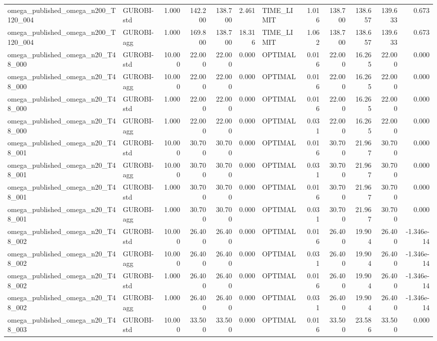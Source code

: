 \begin{table}[htbp]
\begin{tabular}{llrrrrlrrrrr}
omega\_published\_omega\_n200\_T120\_004 & GUROBI-std & 1.000 & 142.200 & 138.700 & 2.461 & TIME\_LIMIT & 1.016 & 138.700 & 138.657 & 139.633 & 0.673 \\
omega\_published\_omega\_n200\_T120\_004 & GUROBI-agg & 1.000 & 169.800 & 138.700 & 18.316 & TIME\_LIMIT & 1.062 & 138.700 & 138.657 & 139.633 & 0.673 \\
omega\_published\_omega\_n20\_T48\_000 & GUROBI-std & 10.000 & 22.000 & 22.000 & 0.000 & OPTIMAL & 0.016 & 22.000 & 16.265 & 22.000 & 0.000 \\
omega\_published\_omega\_n20\_T48\_000 & GUROBI-agg & 10.000 & 22.000 & 22.000 & 0.000 & OPTIMAL & 0.016 & 22.000 & 16.265 & 22.000 & 0.000 \\
omega\_published\_omega\_n20\_T48\_000 & GUROBI-std & 1.000 & 22.000 & 22.000 & 0.000 & OPTIMAL & 0.016 & 22.000 & 16.265 & 22.000 & 0.000 \\
omega\_published\_omega\_n20\_T48\_000 & GUROBI-agg & 1.000 & 22.000 & 22.000 & 0.000 & OPTIMAL & 0.031 & 22.000 & 16.265 & 22.000 & 0.000 \\
omega\_published\_omega\_n20\_T48\_001 & GUROBI-std & 10.000 & 30.700 & 30.700 & 0.000 & OPTIMAL & 0.016 & 30.700 & 21.967 & 30.700 & 0.000 \\
omega\_published\_omega\_n20\_T48\_001 & GUROBI-agg & 10.000 & 30.700 & 30.700 & 0.000 & OPTIMAL & 0.031 & 30.700 & 21.967 & 30.700 & 0.000 \\
omega\_published\_omega\_n20\_T48\_001 & GUROBI-std & 1.000 & 30.700 & 30.700 & 0.000 & OPTIMAL & 0.016 & 30.700 & 21.967 & 30.700 & 0.000 \\
omega\_published\_omega\_n20\_T48\_001 & GUROBI-agg & 1.000 & 30.700 & 30.700 & 0.000 & OPTIMAL & 0.031 & 30.700 & 21.967 & 30.700 & 0.000 \\
omega\_published\_omega\_n20\_T48\_002 & GUROBI-std & 10.000 & 26.400 & 26.400 & 0.000 & OPTIMAL & 0.016 & 26.400 & 19.904 & 26.400 & -1.346e-14 \\
omega\_published\_omega\_n20\_T48\_002 & GUROBI-agg & 10.000 & 26.400 & 26.400 & 0.000 & OPTIMAL & 0.031 & 26.400 & 19.904 & 26.400 & -1.346e-14 \\
omega\_published\_omega\_n20\_T48\_002 & GUROBI-std & 1.000 & 26.400 & 26.400 & 0.000 & OPTIMAL & 0.016 & 26.400 & 19.904 & 26.400 & -1.346e-14 \\
omega\_published\_omega\_n20\_T48\_002 & GUROBI-agg & 1.000 & 26.400 & 26.400 & 0.000 & OPTIMAL & 0.031 & 26.400 & 19.904 & 26.400 & -1.346e-14 \\
omega\_published\_omega\_n20\_T48\_003 & GUROBI-std & 10.000 & 33.500 & 33.500 & 0.000 & OPTIMAL & 0.016 & 33.500 & 23.586 & 33.500 & 0.000 \\

\end{tabular}
\end{table}

